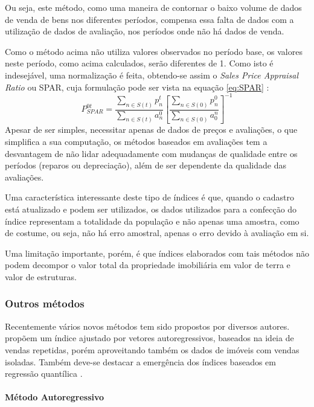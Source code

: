\documentclass[
	12pt,				%
	oneside,			%
	a4paper,			%
	chapter=TITLE,		%
	section=TITLE,		%
	english,			%
	brazil				%
	]{abntex2}
\begin{document}
\begin{refsection}
Ou seja, este método, como uma maneira de contornar o baixo volume de dados de
venda de bens nos diferentes períodos, compensa essa falta de dados com a
utilização de dados de avaliação, nos períodos onde não há dados de venda.

Como o método acima não utiliza valores observados no período base, os valores
neste período, como acima calculados, serão diferentes de 1. Como isto é
indesejável, uma normalização é feita, obtendo-se assim o \emph{Sales Price Appraisal
Ratio} ou SPAR, cuja formulação pode ser vista na equação \eqref{eq:SPAR}
\autocite[75]{rppi}:
\begin{equation}
P_{SPAR}^{0t} = \frac{\sum\limits_{n \in S(t)} p_n^t}{\sum\limits_{n \in S(t)} a_n^0} \left [ \frac{\sum\limits_{n \in S(0)} p_n^0}{\sum\limits_{n \in S(0)} a_0^n} \right ]^{-1}
\label{eq:SPAR}
\end{equation}
Apesar de ser simples, necessitar apenas de dados de preços e avaliações, o que
simplifica a sua computação, os métodos baseados em avaliações tem a desvantagem
de não lidar adequadamente com mudanças de qualidade entre os períodos (reparos
ou depreciação), além de ser dependente da qualidade das avaliações.

Uma característica interessante deste tipo de índices é que, quando o cadastro
está atualizado e podem ser utilizados, os dados utilizados para a confecção do
índice representam a totalidade da população e não apenas uma amostra, como de
costume, ou seja, não há erro amostral, apenas o erro devido à avaliação em si.

Uma limitação importante, porém, é que índices elaborados com tais métodos não
podem decompor o valor total da propriedade imobiliária em valor de terra e
valor de estruturas.

\hypertarget{outros-muxe9todos}{%
\subsubsection{Outros métodos}\label{outros-muxe9todos}}

Recentemente vários novos métodos tem sido propostos por diversos autores.
\textcite{nagaraja2011} propõem um índice ajustado por vetores autoregressivos, baseados
na ideia de vendas repetidas, porém aproveitando também os dados de imóveis com
vendas isoladas. Também deve-se destacar a emergência dos índices baseados em
regressão quantílica \autocite{Coulson,ZHANG201785,Wen}.

\hypertarget{muxe9todo-autoregressivo}{%
\paragraph{Método Autoregressivo}\label{muxe9todo-autoregressivo}}


\end{refsection}
\end{document}
